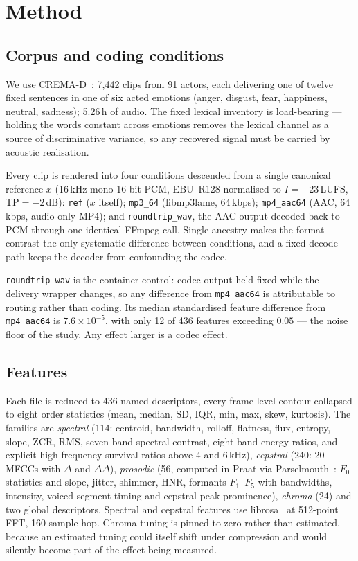 \documentclass[a4paper,9pt,twocolumn]{extarticle}
\newcommand{\ft}[1]{\texttt{\footnotesize #1}}
\begin{document}
\section{Method}
\subsection{Corpus and coding conditions}
We use CREMA-D~\cite{cao2014cremad}: 7{,}442 clips from 91 actors, each
delivering one of twelve fixed sentences in one of six acted emotions
(anger, disgust, fear, happiness, neutral, sadness); 5.26\,h of audio. The
fixed lexical inventory is load-bearing --- holding the words constant across
emotions removes the lexical channel as a source of discriminative variance, so
any recovered signal must be carried by acoustic realisation.

Every clip is rendered into four conditions descended from a single canonical
reference $x$ (16\,kHz mono 16-bit PCM, EBU~R128 normalised to $I=-23$\,LUFS,
TP${}=-2$\,dB): \ft{ref} ($x$ itself); \ft{mp3\_64} (libmp3lame, 64\,kbps);
\ft{mp4\_aac64} (AAC, 64\,kbps, audio-only MP4); and \ft{roundtrip\_wav}, the
AAC output decoded back to PCM through one identical FFmpeg call. Single
ancestry makes the format contrast the only systematic difference between
conditions, and a fixed decode path keeps the decoder from confounding the
codec.

\ft{roundtrip\_wav} is the container control: codec output held fixed while the
delivery wrapper changes, so any difference from \ft{mp4\_aac64} is
attributable to routing rather than coding. Its median standardised feature
difference from \ft{mp4\_aac64} is $7.6\times10^{-5}$, with only 12 of 436
features exceeding $0.05$ --- the noise floor of the study. Any effect larger
is a codec effect.

\subsection{Features}
Each file is reduced to 436 named descriptors, every frame-level contour
collapsed to eight order statistics (mean, median, SD, IQR, min, max, skew,
kurtosis). The families are \emph{spectral} (114: centroid, bandwidth, rolloff,
flatness, flux, entropy, slope, ZCR, RMS, seven-band spectral contrast, eight
band-energy ratios, and explicit high-frequency survival ratios above 4 and
6\,kHz), \emph{cepstral} (240: 20 MFCCs with $\Delta$ and $\Delta\Delta$),
\emph{prosodic} (56, computed in Praat via
Parselmouth~\cite{jadoul2018parselmouth}: $F_0$ statistics and slope, jitter,
shimmer, HNR, formants $F_1$--$F_5$ with bandwidths, intensity, voiced-segment
timing and cepstral peak prominence), \emph{chroma} (24) and two global
descriptors. Spectral and cepstral features use
librosa~\cite{mcfee2015librosa} at 512-point FFT, 160-sample hop. Chroma tuning
is pinned to zero rather than estimated, because an estimated tuning could
itself shift under compression and would silently become part of the effect
being measured.
\end{document}
